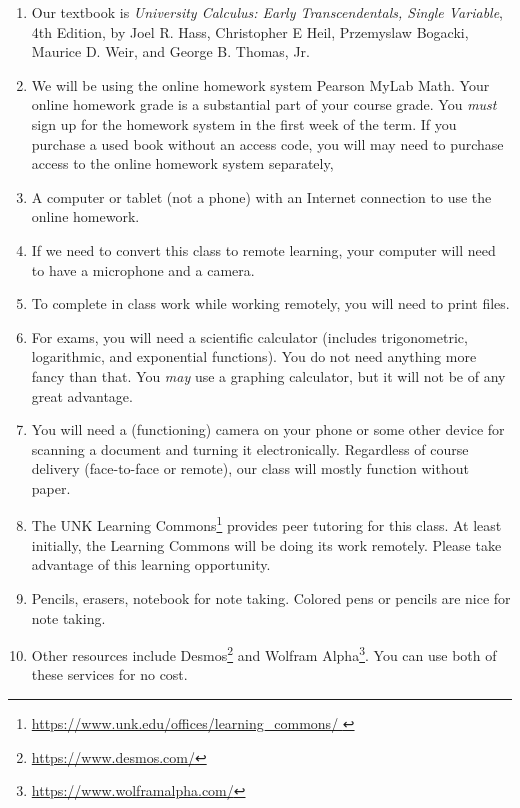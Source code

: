 \documentclass[12pt]{article}
\newcounter{ex}\setcounter{ex}{0}
\newcounter{cy}\setcounter{cy}{\the\year}
\begin{document}
\begin{enumerate}

\item Our textbook is \emph{University Calculus: Early Transcendentals, Single Variable},  4th Edition, by Joel R. Hass, Christopher E Heil, Przemyslaw Bogacki,
Maurice D. Weir,  and George B. Thomas, Jr.

\item We will be using the online homework system Pearson MyLab Math. Your online homework grade is a substantial part of your course grade. You \emph{must} sign up for the homework system in the first week of the term. If you purchase a used book without an access code, you will  may need to purchase access to the online homework system
separately,

\item A computer or tablet (not a phone) with an Internet connection to use the online homework.

\item  If we need to convert this class to remote learning, your computer will need to have a microphone and a camera.

\item To complete in class work while working remotely, you will need to print files.

\item For exams, you will need a scientific calculator (includes trigonometric, logarithmic, and exponential functions).  You do not need anything more fancy than that. You \emph{may} use a graphing
calculator, but it will not be of any great advantage.

\item You will need a (functioning) camera on your phone or some other device for scanning a document and turning it electronically. Regardless of course delivery (face-to-face or remote), our class will mostly function without paper.

\item The UNK Learning Commons\footnote{\url{https://www.unk.edu/offices/learning_commons/ }} provides peer tutoring for this class. At least initially, the Learning Commons will be doing its work remotely. Please take advantage of this learning opportunity.

\item Pencils, erasers, notebook for note taking. Colored pens or pencils are nice for note taking.

 \item Other resources include Desmos\footnote{\url{https://www.desmos.com/}} and Wolfram Alpha\footnote{\url{https://www.wolframalpha.com/}}.  You can use both of these services for no cost.

 \end{enumerate}
\end{document}
